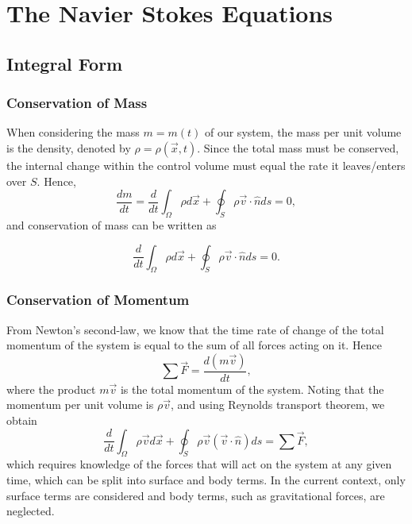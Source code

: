 \chapter{The Navier Stokes Equations} \label{ch:navier_stokes}

\section{Integral Form}
\subsection{Conservation of Mass}
When considering the mass $m = m(t)$ of our system, the mass per unit volume is the density, denoted by $\rho = \rho(\vec{x},t)$. Since the total mass must be conserved, the internal change within the control volume must equal the rate it leaves/enters over $S$. Hence,
\begin{equation}
	\frac{dm}{dt} = \frac{d}{dt}\int_\Omega \rho d\vec{x} + \oint_S \rho \vec{v} \cdot \hat{n} ds = 0,
\end{equation}
and conservation of mass can be written as
\begin{eqBox}
\begin{equation}
	\frac{d}{dt}\int_\Omega \rho d\vec{x} + \oint_S \rho \vec{v} \cdot \hat{n} ds = 0.
\end{equation}
\end{eqBox}

\subsection{Conservation of Momentum}
From Newton's second-law, we know that the time rate of change of the total momentum of the system is equal to the sum of all forces acting on it. Hence
\begin{equation}
	\sum \vec{F} = \frac{d(m \vec{v})}{dt},
\end{equation}
where the product $m \vec{v}$ is the total momentum of the system. Noting that the momentum per unit volume is $\rho \vec{v}$, and using Reynolds transport theorem, we obtain
\begin{equation}
	 \frac{d}{dt}\int_\Omega \rho \vec{v} d\vec{x} + \oint_S \rho \vec{v} (\vec{v} \cdot \hat{n}) ds = \sum \vec{F},
\end{equation}
which requires knowledge of the forces that will act on the system at any given time, which can be split into surface and body terms. In the current context, only surface terms are considered and body terms, such as gravitational forces, are neglected.

